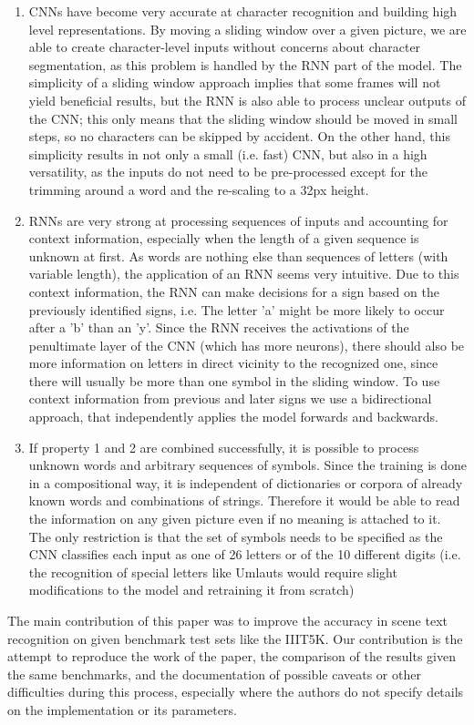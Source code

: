 \documentclass{utue} %
\begin{document}
\begin{enumerate}
	\item CNNs have become very accurate at character recognition and building high level representations. 
	By moving a sliding window over a given picture, we are able to create character-level inputs without concerns about character segmentation, as this problem is handled by the RNN part of the model. The simplicity of a sliding window approach implies that some frames will not yield beneficial results, but the RNN is also able to process unclear outputs of the CNN; this only means that the sliding window should be moved in small steps, so no characters can be skipped by accident. On the other hand, this simplicity results in not only a small (i.e. fast) CNN, but also in a high versatility, as the inputs do not need to be pre-processed except for the trimming around a word and the re-scaling to a 32px height.
	\item RNNs are very strong at processing sequences of inputs and accounting for context information, especially when the length of a given sequence is unknown at first.
	As words are nothing else than sequences of letters (with variable length), the application of an RNN seems very intuitive. Due to this context information, the RNN can make decisions for a sign based on the previously identified signs, i.e. The letter 'a' might be more likely to occur after a 'b' than an 'y'. Since the RNN receives the activations of the penultimate layer of the CNN (which has more neurons), there should also be more information on letters in direct vicinity to the recognized one, since there will usually be more than one symbol in the sliding window. To use context information from previous and later signs we use a bidirectional approach, that independently applies the model forwards and backwards. 
	\item If property 1 and 2 are combined successfully, it is possible to process unknown words and arbitrary sequences of symbols. Since the training is done in a compositional way, it is independent of dictionaries or corpora of already known words and combinations of strings. Therefore it would be able to read the information on any given picture even if no meaning is attached to it. The only restriction is that the set of symbols needs to be specified as the CNN classifies each input as one of 26 letters or of the 10 different digits (i.e. the recognition of special letters like Umlauts would require slight modifications to the model and retraining it from scratch)
\end{enumerate}
The main contribution of this paper was to improve the accuracy in scene text recognition on given benchmark test sets like the IIIT5K.%
Our contribution is the attempt to reproduce the work of the paper, the comparison of the results given the same benchmarks, and the documentation of possible caveats or other difficulties during this process, especially where the authors do not specify details on the implementation or its parameters.
\end{document}

